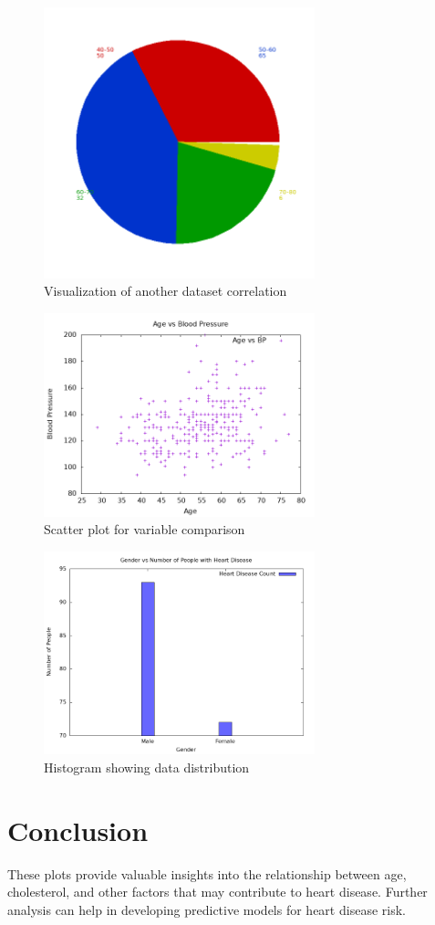 \documentclass{article}
\begin{document}
	\begin{figure}[h!]
		\centering
		\includegraphics[width=0.7\textwidth]{ques4d.png}
		\caption{Visualization of another dataset correlation}
		\label{fig:image2}
	\end{figure}
	
	\begin{figure}[h!]
		\centering
		\includegraphics[width=0.7\textwidth]{ques4b.png}
		\caption{Scatter plot for variable comparison}
		\label{fig:image3}
	\end{figure}
	
	\begin{figure}[h!]
		\centering
		\includegraphics[width=0.7\textwidth]{ques4a.png}
		\caption{Histogram showing data distribution}
		\label{fig:image4}
	\end{figure}
	
	
	
	\section{Conclusion}
	
	These plots provide valuable insights into the relationship between age, cholesterol, and other factors that may contribute to heart disease. Further analysis can help in developing predictive models for heart disease risk.
	
\end{document}
